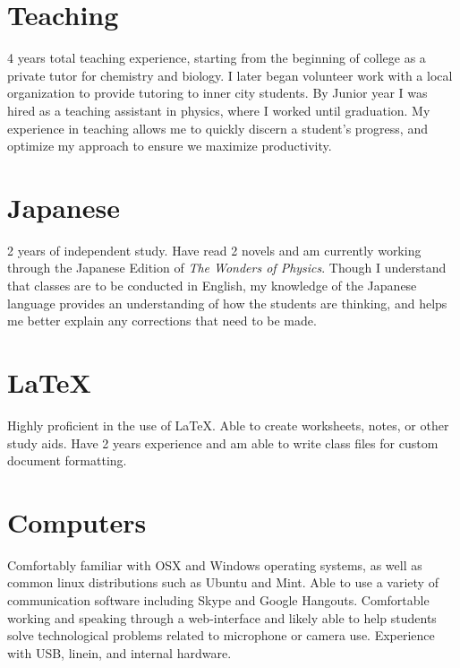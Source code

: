 \documentclass[letterpaper]{easyCV}
\begin{document}
\address{\small{Place where you live}}

\begin{sidebar}[Abilities]{10.5pt}

\section{Teaching}
4 years total teaching experience, starting from the beginning of college 
as a private tutor for chemistry and biology.
I later began volunteer work with a local organization to provide tutoring
to inner city students.  By Junior year I was hired as a teaching assistant in physics,
where I worked until graduation.  My experience in teaching allows me to quickly discern
a student's progress, and optimize my approach to ensure we maximize productivity.  


\section{Japanese}
2 years of independent study.
Have read 2 novels and am currently working through 
the Japanese Edition of \textit{The Wonders of Physics}.  Though I understand that
classes are to be conducted in English, my knowledge of the Japanese language provides
an understanding of how the students are thinking, 
and helps me better explain any corrections that need to be made.

\section{\LaTeX}       
Highly proficient in the use of \LaTeX.  Able to create worksheets,
notes, or other study aids.  Have 2 years experience and am able to write class files
for custom document formatting.  

\section{Computers}
Comfortably familiar with OSX and Windows operating systems,
as well as common linux distributions such as Ubuntu and Mint.
Able to use a variety of communication software including Skype
and Google Hangouts.  Comfortable working and speaking through a web-interface
and likely able to help students solve technological problems
related to microphone or camera use.  Experience with USB, linein, and internal hardware. 

\end{sidebar}
\end{document}
